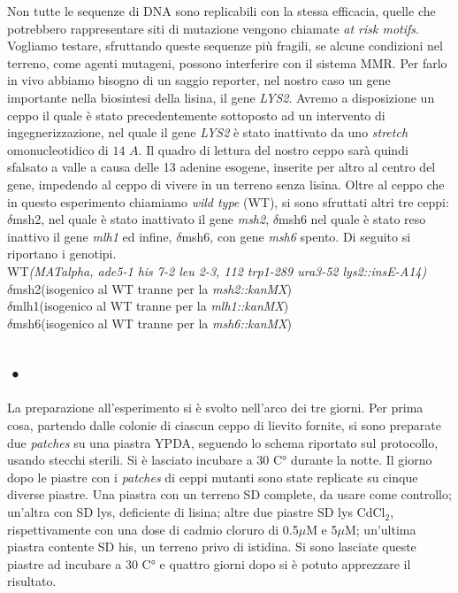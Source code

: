  Non tutte le sequenze di DNA sono replicabili con la stessa efficacia, quelle che potrebbero rappresentare siti di mutazione vengono chiamate \textit{at risk motifs}.  Vogliamo testare, sfruttando queste sequenze più fragili, se alcune condizioni nel terreno, come agenti mutageni, possono interferire con il sistema MMR. Per farlo in vivo abbiamo bisogno di un saggio reporter, nel nostro caso un gene importante nella biosintesi della lisina, il gene \textit{LYS2}. Avremo a disposizione un ceppo il quale è stato precedentemente sottoposto ad un intervento di ingegnerizzazione, nel quale il gene \textit{LYS2} è stato inattivato da uno \textit{stretch} omonucleotidico di $14$ $A$. Il quadro di lettura del nostro ceppo sarà quindi sfalsato a valle a causa delle 13 adenine esogene, inserite per altro al centro del gene, impedendo al ceppo di vivere in un terreno senza lisina. Oltre al ceppo che in questo esperimento chiamiamo \textit{wild type} (WT), si sono sfruttati altri tre ceppi: $\delta$msh2, nel quale è stato inattivato il gene \textit{msh2}, $\delta$msh6 nel quale è stato reso inattivo il gene \textit{mlh1} ed infine, $\delta$msh6, con gene \textit{msh6} spento. Di seguito si riportano i genotipi. \\
WT\textit{(MATalpha, ade5-1 his 7-2 leu 2-3, 112 trp1-289 ura3-52 lys2::insE-A14)} \\
$\delta$msh2(isogenico al WT tranne per la \textit{msh2::kanMX}) \\
$\delta$mlh1(isogenico al WT tranne per la \textit{mlh1::kanMX}) \\
$\delta$msh6(isogenico al WT tranne per la \textit{msh6::kanMX})
 
 
 \subsection{•}
 La preparazione all'esperimento si è svolto nell'arco dei tre giorni. Per prima cosa, partendo dalle colonie di ciascun ceppo di lievito fornite, si sono preparate due \textit{patches} su una piastra YPDA, seguendo lo schema riportato sul protocollo, usando stecchi sterili. Si è lasciato incubare a 30 C° durante la notte. Il giorno dopo le piastre con i \textit{patches} di ceppi mutanti sono state replicate su cinque diverse piastre. Una piastra con un terreno SD complete, da usare come controllo; un'altra con SD lys, deficiente di lisina; altre due piastre SD lys CdCl$_{2}$, rispettivamente con una dose di cadmio cloruro di 0.5$\mu$M e 5$\mu$M; un'ultima piastra contente SD his, un terreno privo di istidina. Si sono lasciate queste piastre ad incubare a 30 C° e quattro giorni dopo si è potuto apprezzare il risultato.
 
